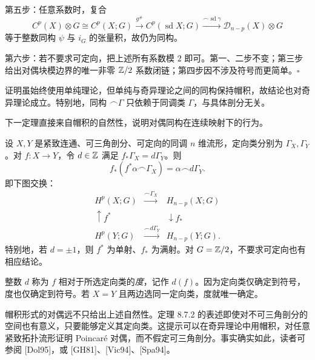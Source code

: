 第五步：任意系数时，复合
\[C^p(X)\otimes G\cong C^p(X;G)\xrightarrow{g^\#}C^p(\operatorname{sd}X;G)
\xrightarrow{\frown\operatorname{sd}\gamma}\mathcal D_{n-p}(X)\otimes G\]
等于整数同构 $\psi$ 与 $i_G$ 的张量积，故仍为同构。

第六步：若不要求可定向，把上述所有系数模 $2$ 即可。第一、二步不变；第三步给出对偶块模边界的唯一非零 $\mathbb{Z}/2$ 系数闭链；第四步因不涉及符号而更简单。\hfill$\square$

证明虽始终使用单纯理论，但单纯与奇异理论之间的同构保持帽积，故结论也对奇异理论成立。特别地，同构 $\frown\Gamma$ 只依赖于同调类 $\Gamma$，与具体剖分无关。

下一定理直接来自帽积的自然性，说明对偶同构在连续映射下的行为。

设 $X,Y$ 是紧致连通、可三角剖分、可定向的同调 $n$ 维流形，定向类分别为 $\Gamma_X,\Gamma_Y$。对 $f:X\to Y$，令 $d\in\mathbb{Z}$ 满足 $f_*\Gamma_X=d\Gamma_Y$。则
\[f_*(f^*\alpha\frown\Gamma_X)=\alpha\frown d\Gamma_Y.\]
即下图交换：
\[
\begin{array}{ccc}
H^p(X;G)&\xrightarrow{\frown\Gamma_X}&H_{n-p}(X;G)\\
\uparrow f^*&&\downarrow f_*\\
H^p(Y;G)&\xrightarrow{\frown d\Gamma_Y}&H_{n-p}(Y;G).
\end{array}
\]
特别地，若 $d=\pm1$，则 $f^*$ 为单射、$f_*$ 为满射。对 $G=\mathbb{Z}/2$，不要求可定向也有相应结论。

整数 $d$ 称为 $f$ 相对于所选定向类的\emph{度}，记作 $d(f)$。因为定向类仅确定到符号，度也仅确定到符号。若 $X=Y$ 且两边选同一定向类，度就唯一确定。

帽积形式的对偶远不只给出上述自然性。定理 8.7.2 的表述即使对不可三角剖分的空间也有意义，只要能够定义其定向类。这提示可以在奇异理论中用帽积，对任意紧致拓扑流形证明 Poincaré 对偶，而不假定可三角剖分。事实确实如此，读者可参阅 [Dol95]，或 [GH81]、[Vic94]、[Spa94]。

